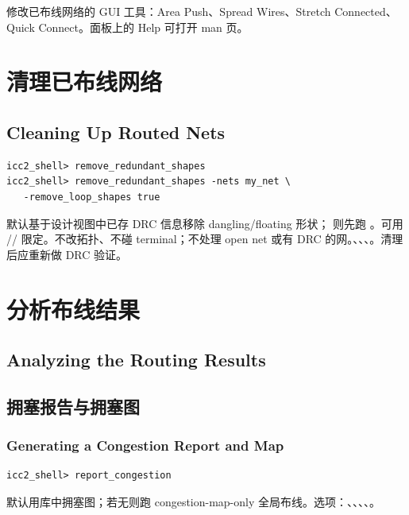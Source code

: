 修改已布线网络的 GUI 工具：Area Push、Spread Wires、Stretch Connected、Quick Connect。面板上的 Help 可打开 man 页。

\section{清理已布线网络}
\subsection*{Cleaning Up Routed Nets}

\begin{lstlisting}
icc2_shell> remove_redundant_shapes
icc2_shell> remove_redundant_shapes -nets my_net \
   -remove_loop_shapes true
\end{lstlisting}

默认基于设计视图中已存 DRC 信息移除 dangling/floating 形状； 则先跑 。可用 // 限定。不改拓扑、不碰 terminal；不处理 open net 或有 DRC 的网。、、、。清理后应重新做 DRC 验证。

\section{分析布线结果}
\subsection*{Analyzing the Routing Results}

\subsection{拥塞报告与拥塞图}
\subsubsection*{Generating a Congestion Report and Map}

\begin{lstlisting}
icc2_shell> report_congestion
\end{lstlisting}

默认用库中拥塞图；若无则跑 congestion-map-only 全局布线。选项：、、、、。

